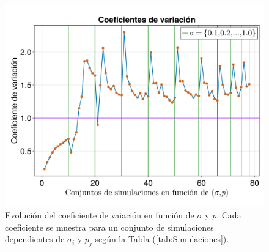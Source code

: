 \documentclass[a4paper,11pt]{book}
\theoremstyle{plain}
\theoremstyle{definition}
\begin{document}
\begin{figure}[h!]
	\centering
	\includegraphics[scale=0.24]{../Imagenes/CoeficientesVariacion}
	\caption{Evolución del coeficiente de vaiación en función de $\sigma$ y $p$. Cada coeficiente se muestra para un conjunto de simulaciones dependientes de $\sigma_i$ y $p_j$ según la Tabla (\ref{tab:Simulaciones}).}
	\label{fig:CoeficientesVariacion}
\end{figure}
\end{document}
